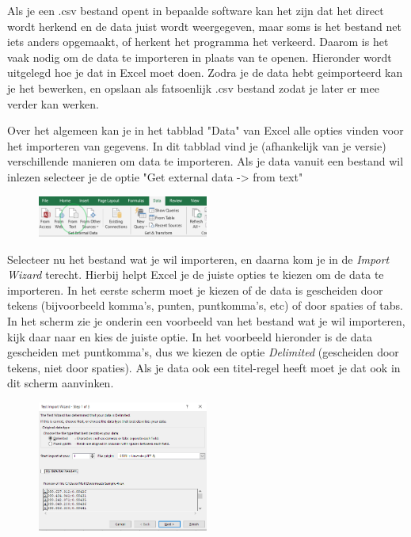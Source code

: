 Als je een .csv bestand opent in bepaalde software kan het zijn dat het direct wordt herkend en de data juist wordt weergegeven, maar soms is het bestand net iets anders opgemaakt, of herkent het programma het verkeerd. Daarom is het vaak nodig om de data te importeren in plaats van te openen. Hieronder wordt uitgelegd hoe je dat in Excel moet doen. Zodra je de data hebt geimporteerd kan je het bewerken, en opslaan als fatsoenlijk .csv bestand zodat je later er mee verder kan werken.

Over het algemeen kan je in het tabblad "Data" van Excel alle opties vinden voor het importeren van gegevens. In dit tabblad vind je (afhankelijk van je versie) verschillende manieren om data te importeren. Als je data vanuit een bestand wil inlezen selecteer je de optie "Get external data -> from text"

\begin{figure}[h]
\begin{center}
\includegraphics[width=0.5\textwidth]{img/Excelimport.png}
\end{center}
\end{figure}

Selecteer nu het bestand wat je wil importeren, en daarna kom je in de \textit{Import Wizard} terecht. Hierbij helpt Excel je de juiste opties te kiezen om de data te importeren. In het eerste scherm moet je kiezen of de data is gescheiden door tekens (bijvoorbeeld komma's, punten, puntkomma's, etc) of door spaties of tabs. In het scherm zie je onderin een voorbeeld van het bestand wat je wil importeren, kijk daar naar en kies de juiste optie. In het voorbeeld hieronder is de data gescheiden met puntkomma's, dus we kiezen de optie \textit{Delimited} (gescheiden door tekens, niet door spaties). Als je data ook een titel-regel heeft moet je dat ook in dit scherm aanvinken. 


\begin{figure}[h]
\begin{center}
\includegraphics[width=0.5\textwidth]{img/Excelimport2.png}
\end{center}
\end{figure}

